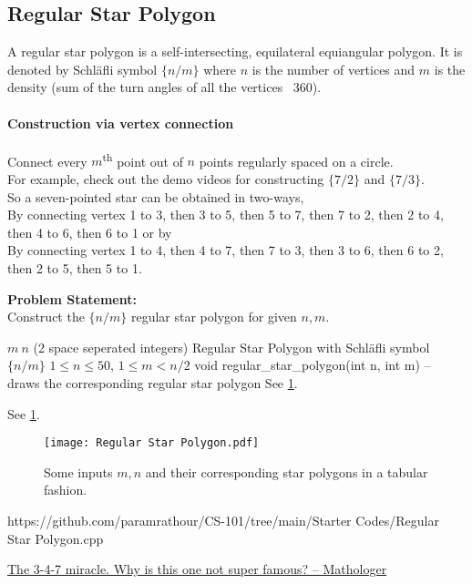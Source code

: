 \documentclass[../../Problems]{subfiles}
\begin{document}
\subsection{Regular Star Polygon}{\label{pp:regularstarpolygon}}
A regular star polygon is a self-intersecting, equilateral equiangular polygon. It is denoted by Schl\"afli symbol $\{n/m\}$ where $n$ is the number of vertices and $m$ is the density (sum of the turn angles of all the vertices \ 360\textdegree).
\vspace{-1em}\paragraph{Construction via vertex connection} Connect every $m$\textsuperscript{th} point out of $n$ points regularly spaced on a circle.\\
For example, check out the demo videos for constructing \href{https://youtu.be/NX0khrwWB9A}{$\{7/2\}$} and \href{https://youtu.be/7obp1LBAmBQ}{$\{7/3\}$}.\\
So a seven-pointed star can be obtained in two-ways,\\
By connecting vertex 1 to 3, then 3 to 5, then 5 to 7, then 7 to 2, then 2 to 4, then 4 to 6, then 6 to 1 or by\\
By connecting vertex 1 to 4, then 4 to 7, then 7 to 3, then 3 to 6, then 6 to 2, then 2 to 5, then 5 to 1.

\textbf{Problem Statement:}\\
Construct the $\{n/m\}$ regular star polygon for given $n,m$.
\begin{testcasesFunction}
	{$m\ n$ \hfill(2 space seperated integers)}
	{Regular Star Polygon with Schl\"afli symbol $\{n/m\}$}
	{$1 \leq n \leq 50$, $1 \leq m < n/2$}
	{void regular\_star\_polygon(int n, int m) -- draws the corresponding regular star polygon}
	{See \ref{fig:regularstarpolygon}.}
	{See \ref{fig:regularstarpolygon}.
	\begin{figure}[H]
	\texttt{[image: Regular Star Polygon.pdf]}
	\caption{Some inputs $m,n$ and their corresponding star polygons in a tabular fashion.}
	\label{fig:regularstarpolygon}
	\end{figure}
	}
	{https://github.com/paramrathour/CS-101/tree/main/Starter Codes/Regular Star Polygon.cpp}
\end{testcasesFunction}
\begin{funvideo}
\href{https://youtu.be/oEN0o9ZGmOM}{The 3-4-7 miracle. Why is this one not super famous? -- Mathologer}
\end{funvideo}
\end{document}
